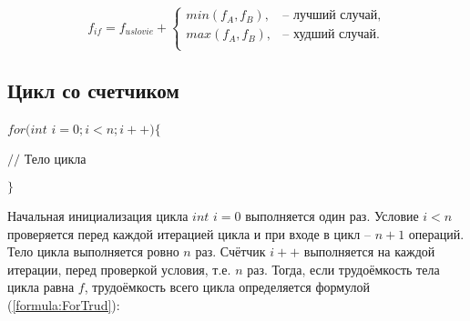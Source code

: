     \begin{equation}\label{formula:IfTrud}
    f_{if} = f_{uslovie} + \begin{cases}
        min(f_A, f_B), &\text{-- лучший случай},\\
        max(f_A, f_B), &\text{-- худший случай}.\\
    \end{cases}
    \end{equation}

    \subsection{Цикл со счетчиком}

    \par \begin{math}for(int\end{math} \begin{math} i = 0; i < n; i++) \{\end{math}
    \par \begin{math} //\end{math} Тело цикла
    \par \begin{math}\}\end{math}

    \par Начальная инициализация цикла \begin{math}int\end{math} \begin{math}i = 0\end{math} выполняется один раз. Условие \begin{math}i < n\end{math} проверяется перед каждой итерацией цикла и при входе в цикл -- \begin{math}n + 1\end{math} операций. Тело цикла выполняется ровно \begin{math}n\end{math} раз. Счётчик \begin{math}i++\end{math} выполняется на каждой итерации, перед проверкой условия, т.е. \begin{math}n\end{math} раз. Тогда, если трудоёмкость тела цикла равна \begin{math}f\end{math}, трудоёмкость всего цикла определяется формулой (\ref{formula:ForTrud}):

